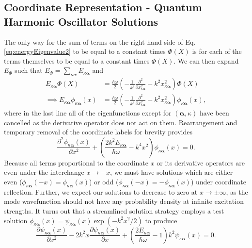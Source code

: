 \documentclass{article}
\numberwithin{equation}{section}
\begin{document}
\subsection{Coordinate Representation - Quantum Harmonic Oscillator Solutions}

The only way for the sum of terms on the right hand side of Eq. \eqref{eq:energyEigenvalue2} to be equal to a constant times $\Phi(X)$ is for each of the terms themselves to be equal to a constant times $\Phi(X)$. We can then expand $E_\Phi$ such that $E_\Phi = \sum_{\kappa\bm{\alpha}}E_{\kappa\bm{\alpha}}$ and
\begin{equation}
\begin{split}
E_{\kappa\bm{\alpha}}\Phi(X) &= \frac{\hbar\omega}{2}\left(-\frac{1}{k^2}\frac{\partial^2}{\partial x_{\kappa\bm{\alpha}}^2} + k^2x_{\kappa\bm{\alpha}}^2\right)\Phi(X)\\
\implies E_{\kappa\bm{\alpha}}\phi_{\kappa\bm{\alpha}}(x) &= \frac{\hbar\omega}{2}\left(-\frac{1}{k^2}\frac{\partial^2}{\partial x_{\kappa\bm{\alpha}}^2} + k^2x_{\kappa\bm{\alpha}}^2\right)\phi_{\kappa\bm{\alpha}}(x),
\end{split}
\end{equation}
where in the last line all of the eigenfunctions except for $(\bm{\alpha},\kappa)$ have been cancelled as the derivative operator does not act on them. Rearrangement and temporary removal of the coordinate labels for brevity provides
\begin{equation}
\frac{\partial^2\phi_{\kappa\bm{\alpha}}(x)}{\partial x^2} + \left(\frac{2k^2E_{\kappa\bm{\alpha}}}{\hbar\omega} - k^4x^2\right)\phi_{\kappa\bm{\alpha}}(x) = 0.
\end{equation}
Because all terms proportional to the coordinate $x$ or its derivative operators are even under the interchange $x\to-x$, we must have solutions which are either even ($\phi_{\kappa\bm{\alpha}}(-x) = \phi_{\kappa\bm{\alpha}}(x)$) or odd ($\phi_{\kappa\bm{\alpha}}(-x) = -\phi_{\kappa\bm{\alpha}}(x)$) under coordinate reflection. Further, we expect our solutions to decrease to zero at $x\to\pm\infty$, as the mode wavefunction should not have any probability density at infinite excitation strengths. It turns out that a streamlined solution strategy employs a test solution $\phi_{\kappa\bm{\alpha}}(x) = \psi_{\kappa\bm{\alpha}}(x)\exp(-k^2x^2/2)$ to produce
\begin{equation}
\frac{\partial\psi_{\kappa\bm{\alpha}}(x)}{\partial x^2} - 2k^2x\frac{\partial\psi_{\kappa\bm{\alpha}}(x)}{\partial x} + \left(\frac{2E_{\kappa\bm{\alpha}}}{\hbar\omega} - 1\right)k^2\psi_{\kappa\bm{\alpha}}(x) = 0.
\end{equation}
\end{document}
